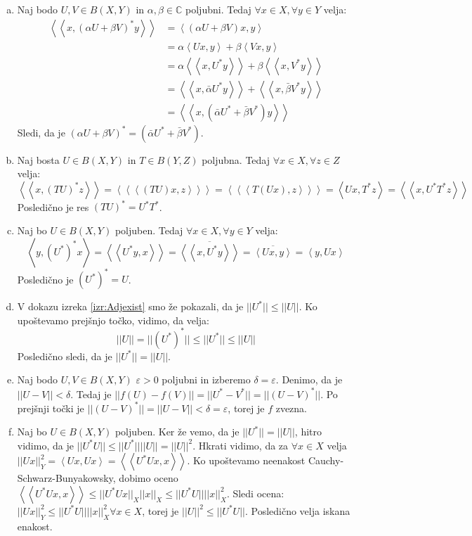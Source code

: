 \documentclass[mat2]{matdelo}
\newcommand{\C}{\mathbb{C}}
\newcommand{\abs}[1]{\ensuremath{\lvert #1 \rvert}}
\newcommand{\norm}[1]{\abs{\abs{#1}}}
\newcommand{\Sp}[2]{\ensuremath{\left<#1, #2\right>}}
\newcommand{\Spp}[2]{\ensuremath{\left<\left<#1, #2\right>\right>}}
\newcommand{\Sppp}[2]{\ensuremath{\left<\left<\left<#1, #2\right>\right>\right>}}
\begin{document}
			\begin{dokaz}
				\begin{enumerate}[a)]
					\item Naj bodo $U, V \in B(X, Y)$ in $\alpha, \beta \in \C$ poljubni. Tedaj $\forall x\in X, \forall y\in Y$ velja: \begin{align*}
						\Spp{x}{(\alpha U + \beta V)^*y} &= \Sp{(\alpha U + \beta V)x}{y} \\
						&= \alpha \Sp{Ux}{y} + \beta \Sp{Vx}{y} \\
						&= \alpha \Spp{x}{U^*y} + \beta\Spp{x}{V^*y} \\
						&= \Spp{x}{\bar{\alpha}U^*y} + \Spp{x}{\bar{\beta}V^*y} \\
						&= \Spp{x}{(\bar{\alpha} U^* + \bar{\beta} V^*)y}
					\end{align*} 
					Sledi, da je $(\alpha U + \beta V)^* = (\bar{\alpha} U^* + \bar{\beta} V^*)$.
					\item Naj bosta $U\in B(X, Y)$ in $T\in B(Y, Z)$ poljubna. Tedaj $\forall x\in X, \forall z\in Z$ velja: $$\Spp{x}{(TU)^*z} = \Sppp{(TU)x}{z} = \Sppp{T(Ux)}{z} = \Sp{Ux}{T^*z} = \Spp{x}{U^*T^*z}$$
					Posledično je res $(TU)^* = U^*T^*$.
					\item Naj bo $U\in B(X, Y)$ poljuben. Tedaj $\forall x\in X, \forall y\in Y$ velja: $$\Sp{y}{(U^*)^*x} = \Spp{U^*y}{x} = \overline{\Spp{x}{U^*y}} = \overline{\Sp{Ux}{y}} = \Sp{y}{Ux}$$
					Posledično je $(U^*)^* = U$.
					\item V dokazu izreka \ref{izr:Adjexist} smo že pokazali, da je $\norm{U^*} \leq \norm{U}$. Ko upoštevamo prejšnjo točko, vidimo, da velja: $$\norm{U} = \norm{(U^*)^*} \leq \norm{U^*} \leq \norm{U}$$
					Posledično sledi, da je $\norm{U^*} = \norm{U}$.
					\item Naj bodo $U, V \in B(X, Y)$ $\varepsilon > 0$ poljubni in izberemo $\delta = \varepsilon$. Denimo, da je $\norm{U - V} < \delta$. Tedaj je $\norm{f(U) - f(V)} = \norm{U^* - V^*} = \norm{(U - V)^*}$. Po prejšnji točki je $\norm{(U-V)^*} = \norm{U - V} < \delta = \varepsilon$, torej je $f$ zvezna.
					\item Naj bo $U\in B(X, Y)$ poljuben. Ker že vemo, da je $\norm{U^*} = \norm{U}$, hitro vidimo, da je $\norm{U^*U}\leq\norm{U^*}\norm{U} = \norm{U}^2$.
					Hkrati vidimo, da za $\forall x\in X$ velja $\norm{Ux}_Y^2 = \Sp{Ux}{Ux} = \Spp{U^*Ux}{x}$. Ko upoštevamo neenakost Cauchy-Schwarz-Bunyakowsky, dobimo oceno $\Spp{U^*Ux}{x} \leq \norm{U^*Ux}_X\norm{x}_X \leq \norm{U^*U}\norm{x}_X^2$. Sledi ocena: $\norm{Ux}_Y^2 \leq \norm{U^*U}\norm{x}_X^2 \forall x\in X$, torej je $\norm{U}^2 \leq \norm{U^* U}$. Posledično velja iskana enakost.
				\end{enumerate}
			\end{dokaz}
\end{document}
